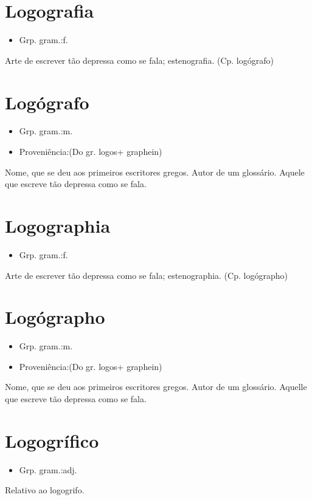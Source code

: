 \section{Logografia}
\begin{itemize}
\item {Grp. gram.:f.}
\end{itemize}
Arte de escrever tão depressa como se fala; estenografia.
(Cp. \textunderscore logógrafo\textunderscore )
\section{Logógrafo}
\begin{itemize}
\item {Grp. gram.:m.}
\end{itemize}
\begin{itemize}
\item {Proveniência:(Do gr. \textunderscore logos\textunderscore  + \textunderscore graphein\textunderscore )}
\end{itemize}
Nome, que se deu aos primeiros escritores gregos.
Autor de um glossário.
Aquele que escreve tão depressa como se fala.
\section{Logographia}
\begin{itemize}
\item {Grp. gram.:f.}
\end{itemize}
Arte de escrever tão depressa como se fala; estenographia.
(Cp. \textunderscore logógrapho\textunderscore )
\section{Logógrapho}
\begin{itemize}
\item {Grp. gram.:m.}
\end{itemize}
\begin{itemize}
\item {Proveniência:(Do gr. \textunderscore logos\textunderscore  + \textunderscore graphein\textunderscore )}
\end{itemize}
Nome, que se deu aos primeiros escritores gregos.
Autor de um glossário.
Aquelle que escreve tão depressa como se fala.
\section{Logogrífico}
\begin{itemize}
\item {Grp. gram.:adj.}
\end{itemize}
Relativo ao logogrifo.

